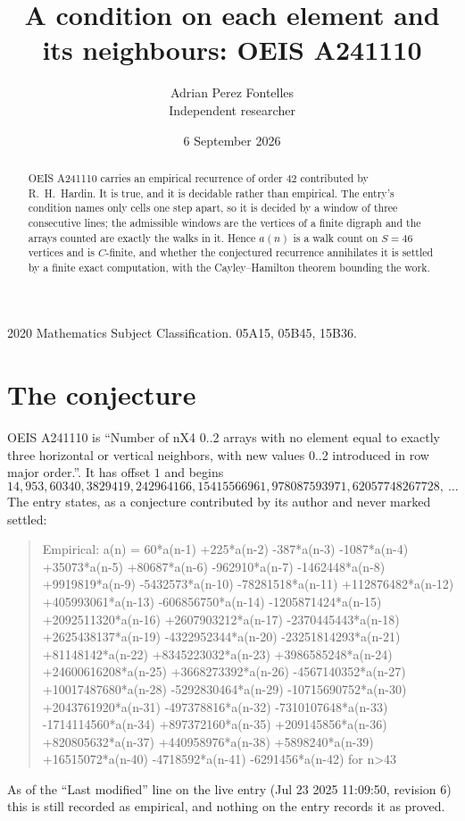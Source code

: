 \documentclass[11pt,a4paper]{article}
\title{A condition on each element and its neighbours: OEIS A241110}
\author{Adrian Perez Fontelles\\ \small Independent researcher}
\date{6 September 2026}
\theoremstyle{plain}
\theoremstyle{definition}
\begin{document}
\maketitle

\begin{abstract}
OEIS A241110 carries an empirical recurrence of order $42$ contributed by R.~H.~Hardin. It is
true, and it is decidable rather than empirical. The entry's condition names only cells one step apart, so it is decided by a window of
three consecutive lines; the
admissible windows are the vertices of a finite digraph and the arrays counted are exactly the
walks in it. Hence $a(n)$ is a walk count on $S=46$ vertices and is $C$-finite, and whether the
conjectured recurrence annihilates it is settled by a finite exact computation, with the
Cayley--Hamilton theorem bounding the work.
\end{abstract}

\noindent\small 2020 Mathematics Subject Classification. 05A15, 05B45, 15B36.\normalsize

\section{The conjecture}

OEIS A241110 is ``Number of nX4 0..2 arrays with no element equal to exactly three horizontal or vertical neighbors, with new values 0..2 introduced in row major order.''. It has offset $1$ and begins
\[
14, 953, 60340, 3829419, 242964166, 15415566961, 978087593971, 62057748267728,\ \dots
\]
The entry states, as a conjecture contributed by its author and never marked settled:
\begin{quote}
Empirical: a(n) = 60*a(n-1) +225*a(n-2) -387*a(n-3) -1087*a(n-4) +35073*a(n-5) +80687*a(n-6) -962910*a(n-7) -1462448*a(n-8) +9919819*a(n-9) -5432573*a(n-10) -78281518*a(n-11) +112876482*a(n-12) +405993061*a(n-13) -606856750*a(n-14) -1205871424*a(n-15) +2092511320*a(n-16) +2607903212*a(n-17) -2370445443*a(n-18) +2625438137*a(n-19) -4322952344*a(n-20) -23251814293*a(n-21) +81148142*a(n-22) +8345223032*a(n-23) +3986585248*a(n-24) +24600616208*a(n-25) +3668273392*a(n-26) -4567140352*a(n-27) +10017487680*a(n-28) -5292830464*a(n-29) -10715690752*a(n-30) +2043761920*a(n-31) -497378816*a(n-32) -7310107648*a(n-33) -1714114560*a(n-34) +897372160*a(n-35) +209145856*a(n-36) +820805632*a(n-37) +440958976*a(n-38) +5898240*a(n-39) +16515072*a(n-40) -4718592*a(n-41) -6291456*a(n-42) for n>43
\end{quote}
As of the ``Last modified'' line on the live entry (Jul 23 2025 11:09:50, revision 6) this is still
recorded as empirical, and nothing on the entry records it as proved.
\end{document}
